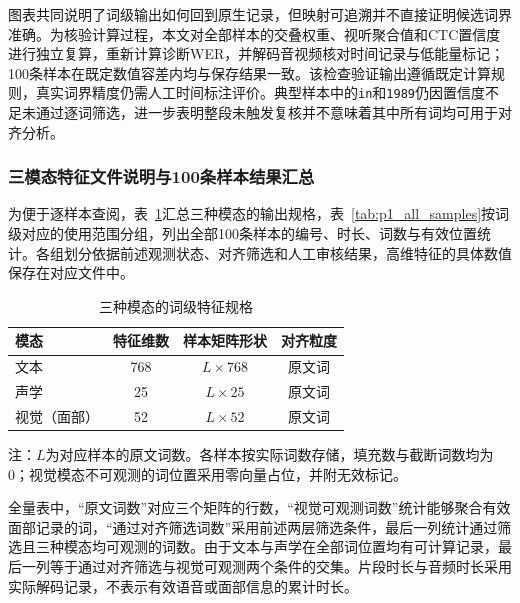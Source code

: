 图表共同说明了词级输出如何回到原生记录，但映射可追溯并不直接证明候选词界准确。为核验计算过程，本文对全部样本的交叠权重、视听聚合值和CTC置信度进行独立复算，重新计算诊断WER，并解码音视频核对时间记录与低能量标记；100条样本在既定数值容差内均与保存结果一致。该检查验证输出遵循既定计算规则，真实词界精度仍需人工时间标注评价。典型样本中的\texttt{in}和\texttt{1989}仍因置信度不足未通过逐词筛选，进一步表明整段未触发复核并不意味着其中所有词均可用于对齐分析。

\subsubsection{三模态特征文件说明与100条样本结果汇总}
\label{sec:p1_delivery}

为便于逐样本查阅，表~\ref{tab:p1_feature_specification}汇总三种模态的输出规格，表~\ref{tab:p1_all_samples}按词级对应的使用范围分组，列出全部100条样本的编号、时长、词数与有效位置统计。各组划分依据前述观测状态、对齐筛选和人工审核结果，高维特征的具体数值保存在对应文件中。

\begin{table}[H]
    \centering\small
    \caption{三种模态的词级特征规格}
    \label{tab:p1_feature_specification}
    \setlength{\tabcolsep}{6pt}
    \renewcommand{\arraystretch}{1.12}
    \ifdefined\pOneCompactTableBox\else\newsavebox{\pOneCompactTableBox}\fi
    \begin{lrbox}{\pOneCompactTableBox}
    \begin{tabular}{lccc}
        \toprule
        模态 & 特征维数 & 样本矩阵形状 & 对齐粒度\\
        \midrule
        文本 & 768 & $L\times768$ & 原文词\\
        声学 & 25 & $L\times25$ & 原文词\\
        视觉（面部） & 52 & $L\times52$ & 原文词\\
        \bottomrule
    \end{tabular}
    \end{lrbox}
    \usebox{\pOneCompactTableBox}
\par\smallskip
\parbox{\wd\pOneCompactTableBox}{\footnotesize 注：$L$为对应样本的原文词数。各样本按实际词数存储，填充数与截断词数均为0；视觉模态不可观测的词位置采用零向量占位，并附无效标记。}
\end{table}

全量表中，“原文词数”对应三个矩阵的行数，“视觉可观测词数”统计能够聚合有效面部记录的词，“通过对齐筛选词数”采用前述两层筛选条件，最后一列统计通过筛选且三种模态均可观测的词数。由于文本与声学在全部词位置均有可计算记录，最后一列等于通过对齐筛选与视觉可观测两个条件的交集。片段时长与音频时长采用实际解码记录，不表示有效语音或面部信息的累计时长。

